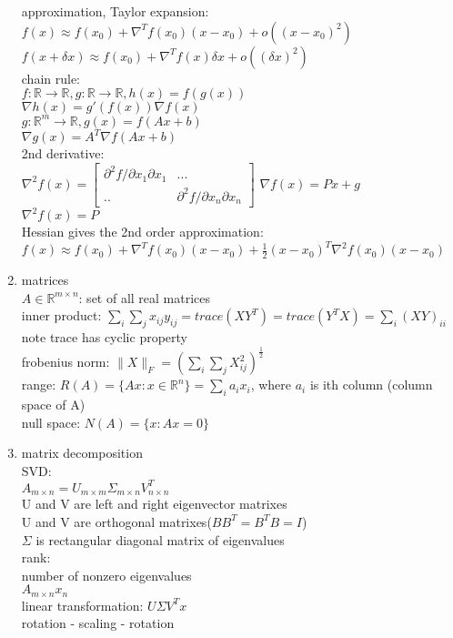 \documentclass[12pt,letter]{article}
\newcommand{\R}{\mathbb{R}}
\begin{document}
\begin{enumerate}
  approximation, Taylor expansion:\\
  $f(x) \approx f(x_0) + \nabla^T f(x_0)(x-x_0) + o((x-x_0)^2)$\\
  $f(x+\delta x) \approx f(x_0) + \nabla^T f(x)\delta x + o((\delta x)^2)$\\
  
  chain rule:\\
  $f: \R \to \R, g: \R \to \R, h(x) = f(g(x))$\\
  $\nabla h(x) = g'(f(x))  \nabla f(x)$\\

  $g:\R^m \to \R, g(x) = f(Ax+b)$\\
  $\nabla g(x) = A^T \nabla f(Ax+b)$\\

  2nd derivative:\\
  $\nabla^2 f(x)=\begin{bmatrix}
    \partial^2 f / \partial x_1 \partial x_1 & ...\\
    .. & \partial^2 f / \partial x_n \partial x_n
  \end{bmatrix}$
  $\nabla f(x)=Px+g$\\
  $\nabla^2 f(x)=P$\\
  Hessian gives the 2nd order approximation:\\
  $f(x) \approx f(x_0) + \nabla^T f(x_0)(x-x_0) + \frac{1}{2}(x-x_0)^T \nabla^2 f(x_0) (x-x_0)$\\

\item matrices\\
  $A \in \R^{m \times n}$: set of all real matrices\\
  inner product: $\sum_i \sum_j x_{ij} y_{ij} = trace(XY^T)=trace(Y^TX)=\sum_{i}(XY)_{ii}$\\
  note trace has cyclic property\\
  frobenius norm: $\|X\|_F  = (\sum_i \sum_j X_{ij}^2)^{\frac{1}{2}}$\\
  range: $R(A) = \{Ax: x \in \R^n\}=\sum_i a_i x_i$, where $a_i$ is ith column (column space of A)\\
  null space: $N(A) = \{ x : Ax = 0\}$\\
  
\item matrix decomposition\\
  SVD:\\
  $A_{m \times n} = U_{m \times m} \Sigma_{m \times n} V_{n \times n}^T$\\
  U and V are left and right eigenvector matrixes\\
  U and V are orthogonal matrixes($BB^T=B^TB=I$)\\
  $\Sigma$ is rectangular diagonal matrix of eigenvalues\\

  rank:\\
  number of nonzero eigenvalues\\

  $A_{m \times n}x_{n}$\\
  linear transformation: $U \Sigma V^T x$\\
  rotation - scaling - rotation\\
  
\end{enumerate}
\end{document}
